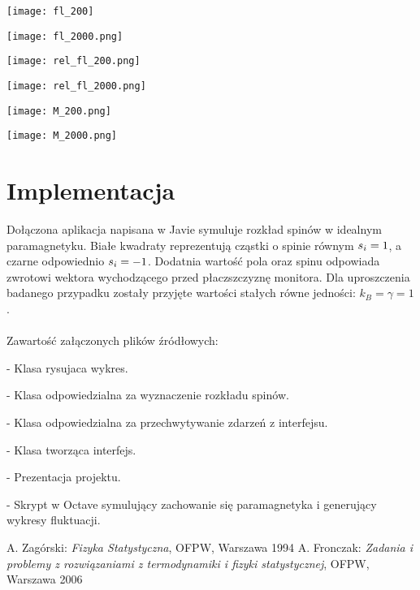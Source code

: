 \documentclass[a4paper,10pt]{article}
\begin{document}
		\texttt{[image: fl\_200]}

		\texttt{[image: fl\_2000.png]}
		
		\texttt{[image: rel\_fl\_200.png]}

		\texttt{[image: rel\_fl\_2000.png]}

		\texttt{[image: M\_200.png]}

		\texttt{[image: M\_2000.png]}
	
	\section{Implementacja}
	Dołączona aplikacja napisana w Javie symuluje rozkład spinów w idealnym paramagnetyku. Białe kwadraty reprezentują cząstki o spinie równym  $s_{i}\nolinebreak=\nolinebreak1$, a czarne odpowiednio $s_{i}\nolinebreak=\nolinebreak-1$. Dodatnia wartość pola oraz spinu odpowiada zwrotowi wektora wychodzącego przed płaczszczyznę monitora. Dla uproszczenia badanego przypadku zostały przyjęte wartości stałych równe jedności: $k_{B}=\gamma=1$.\\ \\
	Zawartość załączonych plików źródłowych:\\
		\begin{description}
		\setlength{\itemindent}{0cm}
		\item[Graph.java] - Klasa rysujaca wykres.
		\item[GraphUpdater.java] - Klasa odpowiedzialna za wyznaczenie rozkładu spinów.
		\item[ModificationListener.java] - Klasa odpowiedzialna za przechwytywanie zdarzeń z interfejsu.
		\item[Window.java] - Klasa tworząca interfejs.
		\item[prezentacja.odp] - Prezentacja projektu.
		\item[simulation.m] - Skrypt w Octave symulujący zachowanie się paramagnetyka i generujący wykresy fluktuacji.
		\end{description}
		
	\begin{thebibliography}{99}
		 A. Zagórski:
			\emph{Fizyka Statystyczna},
			 OFPW, Warszawa 1994
		 A. Fronczak:
			\emph{Zadania i problemy z rozwiązaniami z termodynamiki i fizyki statystycznej},
			 OFPW, Warszawa 2006
		\end{thebibliography}
	
\end{document}
